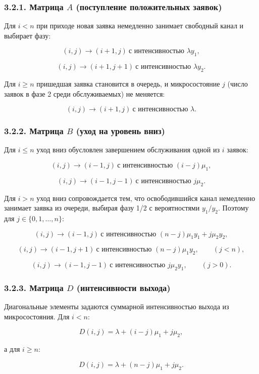 \subsubsection*{3.2.1. Матрица \(A\) (поступление положительных заявок)}
Для \(i<n\) при приходе новая заявка немедленно занимает свободный канал и выбирает фазу:


\[(i,j)\to(i+1,j)\ \text{с интенсивностью }\lambda y_1,\]

\[(i,j)\to(i+1,j+1)\ \text{с интенсивностью }\lambda y_2.\]


Для \(i\ge n\) пришедшая заявка становится в очередь, и микросостояние \(j\) (число заявок в фазе 2 среди обслуживаемых) не меняется:


\[(i,j)\to(i+1,j)\ \text{с интенсивностью }\lambda.\]



\subsubsection*{3.2.2. Матрица \(B\) (уход на уровень вниз)}
Для \(i\le n\) уход вниз обусловлен завершением обслуживания одной из \(i\) заявок:


\[(i,j)\to(i-1,j)\ \text{с интенсивностью }(i-j)\mu_1,\]

\[(i,j)\to(i-1,j-1)\ \text{с интенсивностью }j\mu_2.\]


Для \(i>n\) уход вниз сопровождается тем, что освободившийся канал немедленно занимает заявка из очереди, выбирая фазу 1/2 с вероятностями \(y_1/y_2\). Поэтому для \(j\in\{0,1,\dots,n\}\):


\[(i,j)\to(i-1,j)\ \text{с интенсивностью }(n-j)\mu_1 y_1 + j\mu_2 y_2,\]

\[(i,j)\to(i-1,j+1)\ \text{с интенсивностью }(n-j)\mu_1 y_2,\qquad (j<n),\]

\[(i,j)\to(i-1,j-1)\ \text{с интенсивностью }j\mu_2 y_1,\qquad (j>0).\]



\subsubsection*{3.2.3. Матрица \(D\) (интенсивности выхода)}
Диагональные элементы задаются суммарной интенсивностью выхода из микросостояния. Для \(i<n\):


\[D(i,j)=\lambda + (i-j)\mu_1 + j\mu_2,\]


а для \(i\ge n\):


\[D(i,j)=\lambda + (n-j)\mu_1 + j\mu_2.\]



